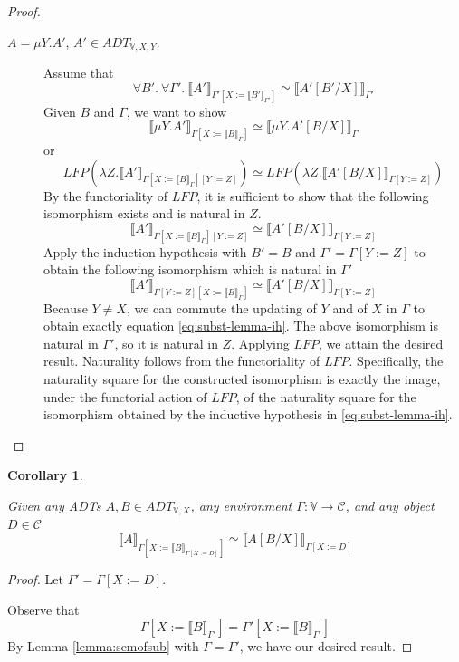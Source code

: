 \documentclass{msthesis}
\newtheorem{corollary}[theorem]{Corollary}
\theoremstyle{definition}
\newcommand{\semof}[1]{\llbracket{#1}\rrbracket}
\newcommand{\mcC}{\mathcal{C}}
\newcommand{\vars}{\mathbb{V}}
\begin{document}
\begin{proof}
\begin{description}
    \item[$A = \mu Y.A'$, $A' \in ADT_{\vars,X,Y}$.]  Assume that
    \[ \forall B'.\ \forall \Gamma'.\ \semof{A'}_{\Gamma'[X:=\semof{B'}_{\Gamma'}]} \simeq \semof{A'[B'/X]}_{\Gamma'} \]
    Given $B$ and $\Gamma$, we want to show
    \[ \semof{\mu Y.A'}_{\Gamma[X:=\semof{B}_\Gamma]} \simeq \semof{\mu Y.A'[B/X]}_\Gamma \]
    or
    \[ LFP(\lambda Z.\semof{A'}_{\Gamma[X:=\semof{B}_\Gamma][Y:= Z]}) \simeq LFP(\lambda Z.\semof{A'[B/X]}_{\Gamma[Y:= Z]}) \]
    By the functoriality of $LFP$, it is sufficient to show that the following isomorphism exists and is natural in $Z$.
    \begin{equation}
        \label{eq:subst-lemma-ih}
    \semof{A'}_{\Gamma[X:=\semof{B}_\Gamma][Y:= Z]} \simeq \semof{A'[B/X]}_{\Gamma[Y:= Z]} 
    \end{equation} 
    Apply the induction hypothesis with $B' = B$ and $\Gamma' = \Gamma[Y:= Z]$ to obtain the following isomorphism which is natural in $\Gamma'$
    \[ \semof{A'}_{\Gamma[Y:= Z][X:=\semof{B}_\Gamma]} \simeq \semof{A'[B/X]}_{\Gamma[Y:=Z]} \]
    Because $Y \neq X$, we can commute the updating of $Y$ and of $X$ in $\Gamma$ to obtain exactly equation \eqref{eq:subst-lemma-ih}.
    The above isomorphism is natural in $\Gamma'$, so it is natural in $Z$.  Applying $LFP$, we attain the desired result.  Naturality follows from the functoriality of $LFP$. Specifically, the naturality square for the constructed isomorphism is exactly the image, under the functorial action of $LFP$, of the naturality square for the isomorphism obtained by the inductive hypothesis in \eqref{eq:subst-lemma-ih}. \qedhere
    \end{description}
\end{proof}
\begin{corollary}\label{cor:semofsub2}

    Given any ADTs $A, B \in ADT_{\vars,X}$, any environment $\Gamma : \vars \to \mcC$, and any object $D \in \mcC$
    \[ \semof{A}_{\Gamma[X:=\semof{B}_{\Gamma[X := D]}]} \simeq \semof{A[B/X]}_{\Gamma[X := D]} \]
\end{corollary}
\begin{proof}
    Let $\Gamma' = \Gamma[X:= D]$.
    
    Observe that
    \[ \Gamma[X := \semof{B}_{\Gamma'}] = \Gamma'[X:= \semof{B}_{\Gamma'}] \]
    By Lemma \ref{lemma:semofsub} with $\Gamma = \Gamma'$, we have our desired result.
\end{proof}
\end{document}
